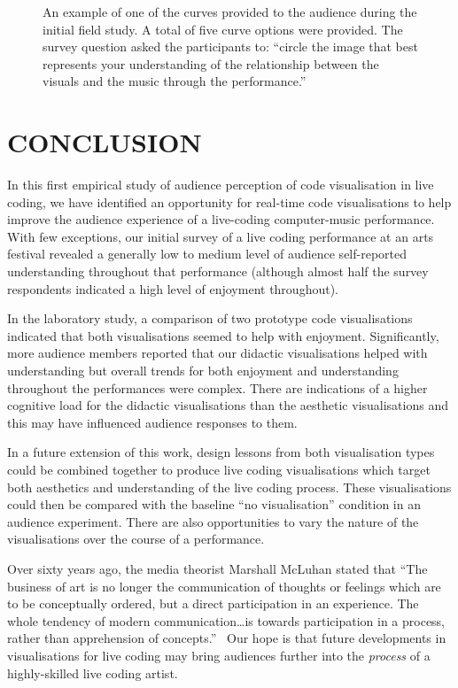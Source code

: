 \documentclass{sig-alternate}
\begin{document}
\fboxsep=6mm
\begin{figure}
\centering
{}
\caption{An example of one of the curves provided to the audience
during the initial field study. A total of five curve options were
provided. The survey question asked the participants to: ``circle the
image that best represents your understanding of the relationship
between the visuals and the music through the performance.''}
\label{fig:understanding-over-time}
\end{figure}

\section*{CONCLUSION}

In this first empirical study of audience perception of code
visualisation in live coding, we have identified an opportunity for
real-time code visualisations to help improve the audience experience
of a live-coding computer-music performance. With few exceptions, our
initial survey of a live coding performance at an arts festival
revealed a generally low to medium level of audience self-reported
understanding throughout that performance (although almost half the
survey respondents indicated a high level of enjoyment throughout).

In the laboratory study, a comparison of two prototype code
visualisations indicated that both visualisations seemed to help with
enjoyment. Significantly, more audience members reported that our
didactic visualisations helped with understanding but overall trends
for both enjoyment and understanding throughout the performances were
complex. There are indications of a higher cognitive load for the
didactic visualisations than the aesthetic visualisations and this may
have influenced audience responses to them.

In a future extension of this work, design lessons from both
visualisation types could be combined together to produce live coding
visualisations which target both aesthetics and understanding of the
live coding process. These visualisations could then be compared with
the baseline ``no visualisation'' condition in an audience experiment.
There are also opportunities to vary the nature of the visualisations
over the course of a performance.

Over sixty years ago, the media theorist Marshall McLuhan stated that
``The business of art is no longer the communication of thoughts or
feelings which are to be conceptually ordered, but a direct
participation in an experience. The whole tendency of modern
communication\ldots is towards participation in a process, rather than
apprehension of concepts.''~\citep{McLuhan} Our hope is that future
developments in visualisations for live coding may bring audiences
further into the \emph{process} of a highly-skilled live coding
artist.
\end{document}
